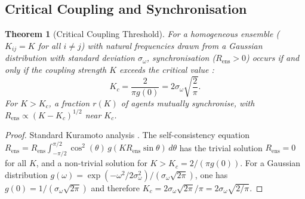 \documentclass[twocolumn,11pt,a4paper]{article}
\theoremstyle{plain}
\newtheorem{theorem}{Theorem}[section]
\theoremstyle{definition}
\theoremstyle{remark}
\begin{document}
\subsection{Critical Coupling and Synchronisation}

\begin{theorem}[Critical Coupling Threshold]
\label{thm:critical}
For a homogeneous ensemble ($K_{ij} = K$ for all $i\ne j$) with natural frequencies drawn from a Gaussian distribution with standard deviation $\sigma_\omega$, synchronisation ($R_\mathrm{ens} > 0$) occurs if and only if the coupling strength $K$ exceeds the critical value \citep{kuramoto1984,strogatz2000,acebron2005}:
\begin{equation}
  K_c = \frac{2}{\pi g(0)} = 2\sigma_\omega\sqrt{\frac{2}{\pi}}.
  \label{eq:critical}
\end{equation}
For $K > K_c$, a fraction $r(K)$ of agents mutually synchronise, with $R_\mathrm{ens} \propto (K - K_c)^{1/2}$ near $K_c$.
\end{theorem}

\begin{proof}
Standard Kuramoto analysis \citep{kuramoto1984,acebron2005}.  The self-consistency equation $R_\mathrm{ens} = R_\mathrm{ens}\int_{-\pi/2}^{\pi/2}\cos^2(\theta)\,g(KR_\mathrm{ens}\sin\theta)\,d\theta$ has the trivial solution $R_\mathrm{ens} = 0$ for all $K$, and a non-trivial solution for $K > K_c = 2/(\pi g(0))$.  For a Gaussian distribution $g(\omega) = \exp(-\omega^2/2\sigma_\omega^2)/(\sigma_\omega\sqrt{2\pi})$, one has $g(0) = 1/(\sigma_\omega\sqrt{2\pi})$ and therefore $K_c = 2\sigma_\omega\sqrt{2\pi}/\pi = 2\sigma_\omega\sqrt{2/\pi}$.
\end{proof}
\end{document}
